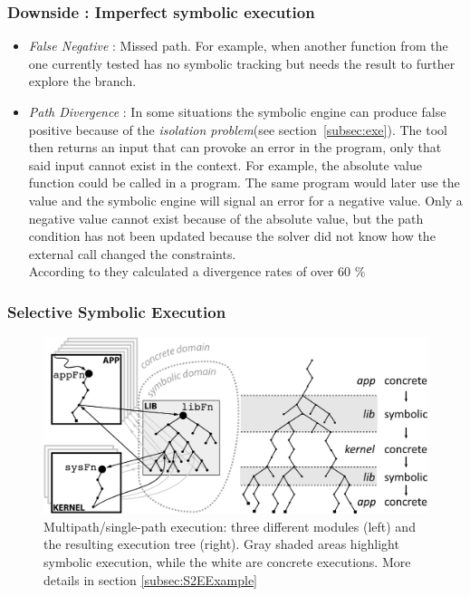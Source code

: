 \documentclass[11pt]{IEEEtran}
\begin{document}
  		\subsubsection*{Downside : Imperfect symbolic execution}
  			\begin{itemize} %
  				\item \emph{False Negative} : Missed path. For example, when another function from the one currently tested has no symbolic tracking but needs the result to further explore the branch.
  				\item \emph{Path Divergence} : In some situations the symbolic engine can produce false positive because of the \emph{isolation problem}(see section~\ref{subsec:exe}). The tool then returns an input that can provoke an error in the program, only that said input cannot exist in the context. For example, the absolute value function could be called in a program. The same program would later use the value and the symbolic engine will signal an error for a negative value. Only a negative value cannot exist because of the absolute value, but the path condition has not been updated because the solver did not know how the external call changed the constraints. \\ %
  				According to \cite{Godefroid2008AutomatedWF} they calculated a divergence rates of over 60 \%
  			\end{itemize}

    	\subsubsection{Selective Symbolic Execution}
    	\label{subsec:selectiveSymbolicExec}
    	
    		\begin{figure}
    			\centering
    			\includegraphics[scale=0.9]{selectiveSymbolicExecExample.png}
    			\caption{Multipath/single-path execution: three different modules (left) and the resulting execution tree (right). Gray shaded areas highlight symbolic execution, while the white are concrete executions. More details in section \ref{subsec:S2EExample}}
    			\label{fig:selectiveSymbolicExample}
    		\end{figure}
    		
\end{document}
